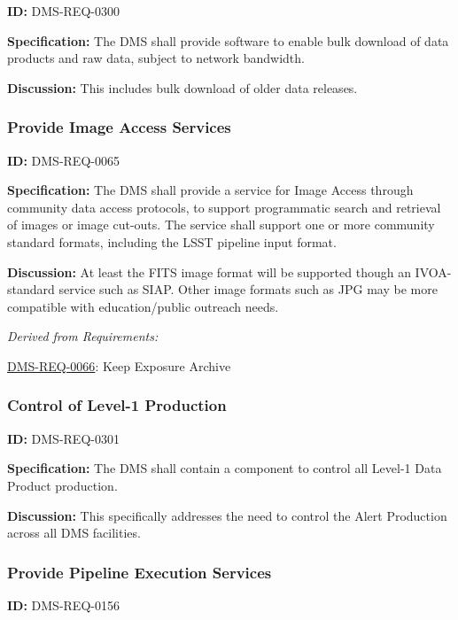 \documentclass[SE,toc,lsstdraft]{lsstdoc}
\begin{document}
\label{DMS-REQ-0300}
\textbf{ID:} DMS-REQ-0300

\textbf{Specification:} The DMS shall provide software to enable bulk download of data products and raw data, subject to network bandwidth.

\textbf{Discussion:} This includes bulk download of older data releases.




\subsubsection{Provide Image Access Services}

\label{DMS-REQ-0065}
\textbf{ID:} DMS-REQ-0065

\textbf{Specification:} The DMS shall provide a service for Image Access through community data access protocols, to support programmatic search and retrieval of images or image cut-outs. The service shall support one or more community standard formats, including the LSST pipeline input format.

\textbf{Discussion:} At least the FITS image format will be supported though an IVOA-standard service such as SIAP. Other image formats such as JPG may be more compatible with education/public outreach needs.




\emph{Derived from Requirements:}

\hyperref[DMS-REQ-0066]{DMS-REQ-0066}:
Keep Exposure Archive \newline


\subsubsection{Control of Level-1 Production}

\label{DMS-REQ-0301}
\textbf{ID:} DMS-REQ-0301

\textbf{Specification:} The DMS shall contain a component to control all Level-1 Data Product production.

\textbf{Discussion: }This specifically addresses the need to control the Alert Production across all DMS facilities.




\subsubsection{Provide Pipeline Execution Services}

\label{DMS-REQ-0156}
\textbf{ID:} DMS-REQ-0156
\end{document}
